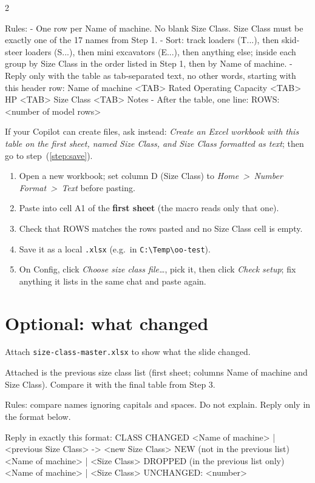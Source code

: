\documentclass[11pt]{article}
\newcommand{\menu}[1]{\textit{#1}}
\newcommand{\gt}{~>\ }
\begin{document}
\begin{multicols}{2}
\begin{prompt}
Rules:
- One row per Name of machine. No blank Size Class. Size Class must be exactly one of the 17 names from Step 1.
- Sort: track loaders (T...), then skid-steer loaders (S...), then mini excavators (E...), then anything else; inside each group by Size Class in the order listed in Step 1, then by Name of machine.
- Reply only with the table as tab-separated text, no other words, starting with this header row:
Name of machine <TAB> Rated Operating Capacity <TAB> HP <TAB> Size Class <TAB> Notes
- After the table, one line: ROWS: <number of model rows>
\end{prompt}
\vspace{0.1em}
{\footnotesize If your Copilot can create files, ask instead: \textit{Create an Excel workbook with this table on the first sheet, named Size Class, and Size Class formatted as text}; then go to step~(\ref{step:save}).}
\begin{enumerate}\footnotesize
  \item Open a new workbook; set column D (Size Class) to \menu{Home\gt Number Format\gt Text} before pasting.
  \item Paste into cell A1 of the \textbf{first sheet} (the macro reads only that one).
  \item Check that ROWS matches the rows pasted and no Size Class cell is empty.
  \item Save it as a local \texttt{.xlsx} (e.g.\ in \texttt{C:\textbackslash Temp\textbackslash oo-test}).\label{step:save}
  \item On Config, click \menu{Choose size class file\ldots}, pick it, then click \menu{Check setup}; fix anything it lists in the same chat and paste again.
\end{enumerate}

\section{Optional: what changed}\label{sec:s4}
{\footnotesize Attach \texttt{size-class-master.xlsx} to show what the slide changed.\par}
\begin{prompt}
Attached is the previous size class list (first sheet; columns Name of machine and Size Class). Compare it with the final table from Step 3.

Rules: compare names ignoring capitals and spaces. Do not explain. Reply only in the format below.

Reply in exactly this format:
CLASS CHANGED
<Name of machine> | <previous Size Class> -> <new Size Class>
NEW (not in the previous list)
<Name of machine> | <Size Class>
DROPPED (in the previous list only)
<Name of machine> | <Size Class>
UNCHANGED: <number>
\end{prompt}
\end{multicols}
\end{document}
